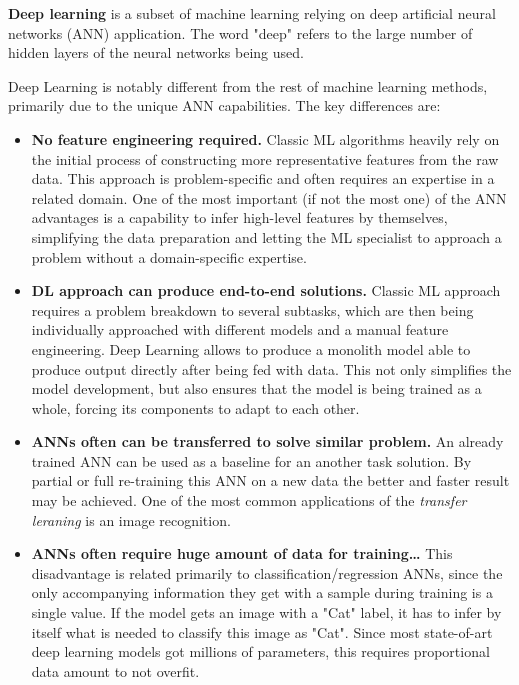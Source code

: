 \documentclass[thesis=B,english]{FITthesis}[2019/12/23]
\begin{document}
	\textbf{Deep learning} is a subset of machine learning relying on deep artificial neural networks (ANN) application. The word "deep" refers to the large number of hidden layers of the neural networks being used.
	
	Deep Learning is notably different from the rest of machine learning methods, primarily due to the unique ANN capabilities. The key differences are:
	\begin{itemize}
		\item \textbf{No feature engineering required.} Classic ML algorithms heavily rely on the initial process of constructing more representative features from the raw data. This approach is problem-specific and often requires an expertise in a related domain. One of the most important (if not the most one) of the ANN advantages is a capability to infer high-level features by themselves, simplifying the data preparation and letting the ML specialist to approach a problem without a domain-specific expertise.
		
		\item \textbf{DL approach can produce end-to-end solutions.} Classic ML approach requires a problem breakdown to several subtasks, which are then being individually approached with different models and a manual feature engineering. Deep Learning allows to produce a monolith model able to produce output directly after being fed with data. This not only simplifies the model development, but also ensures that the model is being trained as a whole, forcing its components to adapt to each other.
		
		\item \textbf{ANNs often can be transferred to solve similar problem.} An already trained ANN can be used as a baseline for an another task solution. By partial or full re-training this ANN on a new data the better and faster result may be achieved. One of the most common applications of the \textit{transfer leraning} is an image recognition\cite{how_transferable}.
		
		\item \textbf{ANNs often require huge amount of data for training\dots}
		This disadvantage is related primarily to classification/regression ANNs, since the only accompanying information they get with a sample during training is a single value. If the model gets an image with a "Cat" label, it has to infer by itself what is needed to classify this image as "Cat". Since most state-of-art deep learning models got millions of parameters, this requires proportional data amount to not overfit.
		

\end{itemize}
\end{document}
